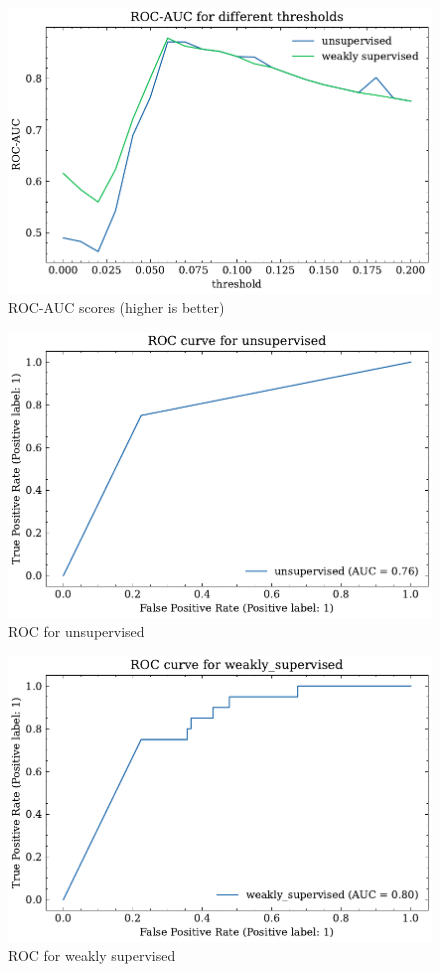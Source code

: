\begin{figure}[htbp]
  \centering
  \includegraphics{5Results/figs/bsle/roc_auc_score_for_thresholds.pdf}
  \caption{ROC-AUC scores (higher is better)}
\end{figure}
\begin{figure}[htbp]
  \centering
  \includegraphics{5Results/figs/bsle/roc_auc_unsupervised.pdf}
  \caption{ROC for unsupervised}
\end{figure}
\begin{figure}[htbp]
  \centering
  \includegraphics{5Results/figs/bsle/roc_auc_weakly_supervised.pdf}
  \caption{ROC for weakly supervised
  }
\end{figure}
